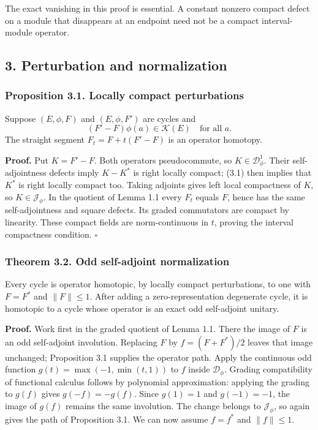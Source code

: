 \documentclass[
  11pt,
]{article}
\begin{document}
The exact vanishing in this proof is essential. A constant nonzero
compact defect on a module that disappears at an endpoint need not be a
compact interval-module operator.

\subsection{3. Perturbation and
normalization}\label{perturbation-and-normalization}

\subsubsection{Proposition 3.1. Locally compact
perturbations}\label{proposition-3.1.-locally-compact-perturbations}

Suppose \((E,\phi,F)\) and \((E,\phi,F')\) are cycles and \[
(F'-F)\phi(a)\in\mathcal K(E)
\quad\text{for all }a.
\tag{3.1}
\] The straight segment \(F_t=F+t(F'-F)\) is an operator homotopy.

\textbf{Proof.} Put \(K=F'-F\). Both operators pseudocommute, so
\(K\in\mathcal D_\phi^1\). Their self-adjointness defects imply
\(K-K^*\) is right locally compact; (3.1) then implies that \(K^*\) is
right locally compact too. Taking adjoints gives left local compactness
of \(K\), so \(K\in\mathcal J_\phi\). In the quotient of Lemma 1.1 every
\(F_t\) equals \(F\), hence has the same self-adjointness and square
defects. Its graded commutators are compact by linearity. These compact
fields are norm-continuous in \(t\), proving the interval compactness
condition. \(\square\)

\subsubsection{Theorem 3.2. Odd self-adjoint
normalization}\label{theorem-3.2.-odd-self-adjoint-normalization}

Every cycle is operator homotopic, by locally compact perturbations, to
one with \(F=F^*\) and \(\|F\|\leq1\). After adding a
zero-representation degenerate cycle, it is homotopic to a cycle whose
operator is an exact odd self-adjoint unitary.

\textbf{Proof.} Work first in the graded quotient of Lemma 1.1. There
the image of \(F\) is an odd self-adjoint involution. Replacing \(F\) by
\(f=(F+F^*)/2\) leaves that image unchanged; Proposition 3.1 supplies
the operator path. Apply the continuous odd function
\(g(t)=\max(-1,\min(t,1))\) to \(f\) inside \(\mathcal D_\phi\). Grading
compatibility of functional calculus follows by polynomial
approximation: applying the grading to \(g(f)\) gives \(g(-f)=-g(f)\).
Since \(g(1)=1\) and \(g(-1)=-1\), the image of \(g(f)\) remains the
same involution. The change belongs to \(\mathcal J_\phi\), so again
gives the path of Proposition 3.1. We can now assume \(f=f^*\) and
\(\|f\|\leq1\).
\end{document}
